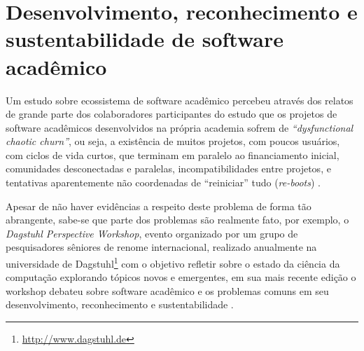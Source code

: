 %

\section{Desenvolvimento, reconhecimento e sustentabilidade de software acadêmico}


Um estudo sobre ecossistema de software acadêmico percebeu através dos relatos
de grande parte dos colaboradores participantes do estudo que os projetos de software
acadêmicos desenvolvidos na própria academia sofrem de {\it ``dysfunctional
chaotic churn''}, ou seja, a existência de muitos projetos, com poucos
usuários, com ciclos de vida curtos, que terminam em paralelo ao financiamento
inicial, comunidades desconectadas e paralelas, incompatibilidades entre
projetos, e tentativas aparentemente não coordenadas de ``reiniciar'' tudo
({\it re-boots}) \cite{howison2015understanding}.


Apesar de não haver evidências a respeito deste problema de forma tão abrangente,
sabe-se que parte dos problemas são realmente fato, por exemplo,
o {\it Dagstuhl Perspective Workshop}, evento organizado por um grupo de
pesquisadores sêniores de renome internacional, realizado anualmente na
universidade de Dagstuhl\footnote{\url{http://www.dagstuhl.de}} com o objetivo
refletir sobre o estado da ciência da computação explorando tópicos novos e
emergentes, em sua mais recente edição o workshop debateu sobre software
acadêmico e os problemas comuns em seu desenvolvimento, reconhecimento e
sustentabilidade \cite{allen2017engineering}.

